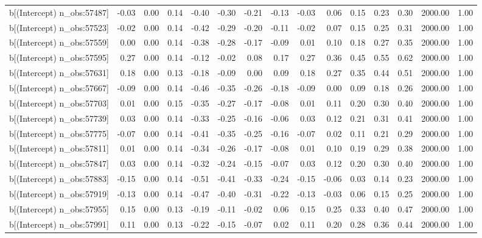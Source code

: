 \begin{table}[ht]
\begin{tabular}{rrrrrrrrrrrrrrr}
  b[(Intercept) n\_obs:57487] & -0.03 & 0.00 & 0.14 & -0.40 & -0.30 & -0.21 & -0.13 & -0.03 & 0.06 & 0.15 & 0.23 & 0.30 & 2000.00 & 1.00 \\ 
  b[(Intercept) n\_obs:57523] & -0.02 & 0.00 & 0.14 & -0.42 & -0.29 & -0.20 & -0.11 & -0.02 & 0.07 & 0.15 & 0.25 & 0.31 & 2000.00 & 1.00 \\ 
  b[(Intercept) n\_obs:57559] & 0.00 & 0.00 & 0.14 & -0.38 & -0.28 & -0.17 & -0.09 & 0.01 & 0.10 & 0.18 & 0.27 & 0.35 & 2000.00 & 1.00 \\ 
  b[(Intercept) n\_obs:57595] & 0.27 & 0.00 & 0.14 & -0.12 & -0.02 & 0.08 & 0.17 & 0.27 & 0.36 & 0.45 & 0.55 & 0.62 & 2000.00 & 1.00 \\ 
  b[(Intercept) n\_obs:57631] & 0.18 & 0.00 & 0.13 & -0.18 & -0.09 & 0.00 & 0.09 & 0.18 & 0.27 & 0.35 & 0.44 & 0.51 & 2000.00 & 1.00 \\ 
  b[(Intercept) n\_obs:57667] & -0.09 & 0.00 & 0.14 & -0.46 & -0.35 & -0.26 & -0.18 & -0.09 & 0.00 & 0.09 & 0.18 & 0.26 & 2000.00 & 1.00 \\ 
  b[(Intercept) n\_obs:57703] & 0.01 & 0.00 & 0.15 & -0.35 & -0.27 & -0.17 & -0.08 & 0.01 & 0.11 & 0.20 & 0.30 & 0.40 & 2000.00 & 1.00 \\ 
  b[(Intercept) n\_obs:57739] & 0.03 & 0.00 & 0.14 & -0.33 & -0.25 & -0.16 & -0.06 & 0.03 & 0.12 & 0.21 & 0.31 & 0.41 & 2000.00 & 1.00 \\ 
  b[(Intercept) n\_obs:57775] & -0.07 & 0.00 & 0.14 & -0.41 & -0.35 & -0.25 & -0.16 & -0.07 & 0.02 & 0.11 & 0.21 & 0.29 & 2000.00 & 1.00 \\ 
  b[(Intercept) n\_obs:57811] & 0.01 & 0.00 & 0.14 & -0.34 & -0.26 & -0.17 & -0.08 & 0.01 & 0.10 & 0.19 & 0.29 & 0.38 & 2000.00 & 1.00 \\ 
  b[(Intercept) n\_obs:57847] & 0.03 & 0.00 & 0.14 & -0.32 & -0.24 & -0.15 & -0.07 & 0.03 & 0.12 & 0.20 & 0.30 & 0.40 & 2000.00 & 1.00 \\ 
  b[(Intercept) n\_obs:57883] & -0.15 & 0.00 & 0.14 & -0.51 & -0.41 & -0.33 & -0.24 & -0.15 & -0.06 & 0.03 & 0.14 & 0.23 & 2000.00 & 1.00 \\ 
  b[(Intercept) n\_obs:57919] & -0.13 & 0.00 & 0.14 & -0.47 & -0.40 & -0.31 & -0.22 & -0.13 & -0.03 & 0.06 & 0.15 & 0.25 & 2000.00 & 1.00 \\ 
  b[(Intercept) n\_obs:57955] & 0.15 & 0.00 & 0.13 & -0.19 & -0.11 & -0.02 & 0.06 & 0.15 & 0.25 & 0.33 & 0.40 & 0.47 & 2000.00 & 1.00 \\ 
  b[(Intercept) n\_obs:57991] & 0.11 & 0.00 & 0.13 & -0.22 & -0.15 & -0.07 & 0.02 & 0.11 & 0.20 & 0.28 & 0.36 & 0.44 & 2000.00 & 1.00 \\ 

\end{tabular}
\end{table}
